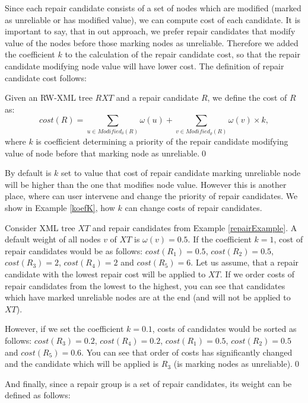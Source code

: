 Since each repair candidate consists of a set of nodes which are modified (marked as unreliable or has modified value), we can compute cost of each candidate. It is important to say, that in out approach, we prefer repair candidates that modify value of the nodes before those marking nodes as unreliable. Therefore we added the coefficient $k$ to the calculation of the repair candidate cost, so that the repair candidate modifying node value will have lower cost. The definition of repair candidate cost follows:

\begin{define}
Given an RW-XML tree $RXT$ and a repair candidate $R$, we define the cost of $R$ as:
$$cost(R) = \sum_{u \in Modified_\delta(R)} \omega(u) + \sum_{v \in Modified_\varrho(R)} \omega(v) \times k,$$
where $k$ is coefficient determining a priority of the repair candidate modifying value of node before that  marking node as unreliable.\qed
\end{define}

By default is $k$ set to value that cost of repair candidate marking unreliable node will be higher than the one that modifies node value. However this is another place, where can user intervene and change the priority of repair candidates. We show in Example \ref{koefK}, how $k$ can change costs of repair candidates.

\begin{example}\label{koefK}
Consider XML tree $XT$ and repair candidates from Example \ref{repairExample}. A default weight of all nodes $v$ of $XT$ is $\omega(v) = 0.5$. If the coefficient $k = 1$, cost of repair candidates would be as follows: $cost(R_1) = 0.5$, $cost(R_2) = 0.5$, $cost(R_3) = 2$, $cost(R_4) = 2$ and $cost(R_5) = 6$.
Let us assume, that a repair candidate with the lowest repair cost will be applied to $XT$. If we order costs of repair candidates from the lowest to the highest, you can see that candidates which have marked unreliable nodes are at the end (and will not be applied to $XT$).

However, if we set the coefficient $k = 0.1$, costs of candidates would be sorted as follows: $cost(R_3) = 0.2$, $cost(R_4) = 0.2$, $cost(R_1) = 0.5$, $cost(R_2)  = 0.5$ and $cost(R_5) = 0.6$. You can see that order of costs has significantly changed and the candidate which will be applied is $R_3$ (is marking nodes as unreliable).\qed
\end{example}

And finally, since a repair group is a set of repair candidates, its weight can be defined as follows:

